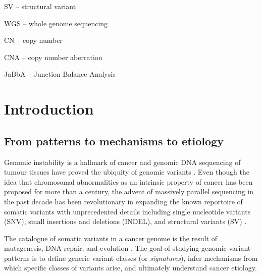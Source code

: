 \documentclass[phd,tocprelim]{cornell}
\begin{document}
\contentspage
\tablelistpage
\figurelistpage
\abbrlist

SV -- structural variant

WGS -- whole genome sequencing

CN -- copy number

CNA -- copy number aberration

JaBbA -- Junction Balance Analysis

\symlist


\normalspacing \setcounter{page}{1} 
\pagestyle{cornell} \addtolength{\parskip}{0.5\baselineskip}


\chapter{Introduction}


\section{From patterns to mechanisms to etiology}
Genomic instability is a hallmark of cancer \cite{Hanahan2011-ni} and genomic DNA sequencing of tumour tissues have proved the ubiquity of genomic variants \cite{pcawg_marker2020-yi}. Even though the idea that chromosomal abnormalities as an intrinsic property of cancer has been proposed \cite{Boveri2008-rl} for more than a century, the advent of massively parallel sequencing in the past decade has been revolutionary in expanding the known reportoire of somatic variants with unprecedented details including single nucleotide variants (SNV), small insertions and deletions (INDEL), and structural variants (SV) \cite{Meyerson2010-xc}.

The catalogue of somatic variants in a cancer genome is the result of mutagenesis, DNA repair, and evolution \cite{Stratton2009-ty}. The goal of studying genomic variant patterns is to define generic variant classes (or \textit{signatures}), infer mechanisms from which specific classes of variants arise, and ultimately understand cancer etiology.
\end{document}
